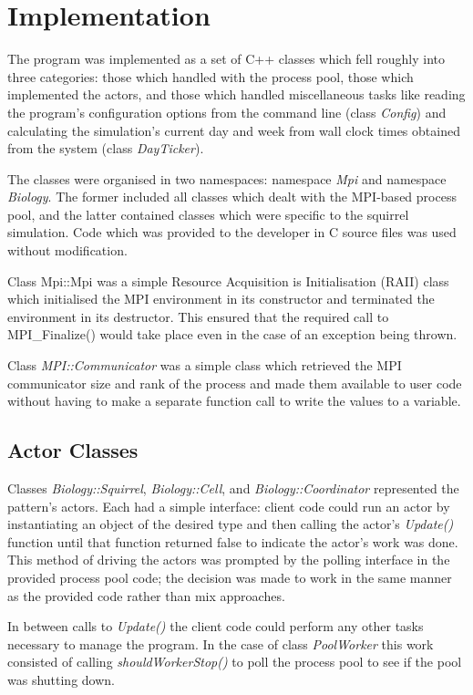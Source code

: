 \documentclass[11pt, oneside]{article}   %
\begin{document}
\newpage

\section{Implementation}
The program was implemented as a set of C++ classes which fell roughly into three categories: those which handled with the process pool, those which implemented the actors, and those which handled miscellaneous tasks like reading the program's configuration options from the command line (class {\em Config}) and calculating the simulation's current day and week from wall clock times obtained from the system (class {\em DayTicker}).

The classes were organised in two namespaces: namespace {\em Mpi} and namespace {\em Biology}.
The former included all classes which dealt with the MPI-based process pool, and the latter contained classes which were specific to the squirrel simulation.
Code which was provided to the developer in C source files was used without modification.

Class Mpi::Mpi was a simple Resource Acquisition is Initialisation (RAII) \cite{ref:Stroustrup} class which initialised the MPI environment in its constructor and terminated the environment in its destructor.
This ensured that the required call to MPI\_Finalize() would take place even in the case of an exception being thrown.  

Class {\em MPI::Communicator} was a simple class which retrieved the MPI communicator size and rank of the process and made them available to user code without having to make a separate function call to write the values to a variable.  

\subsection{Actor Classes}
Classes {\em Biology::Squirrel}, {\em Biology::Cell}, and {\em Biology::Coordinator} represented the pattern's actors.
Each had a simple interface: client code could run an actor by instantiating an object of the desired type and then calling the actor's {\em Update()} function until that function returned false to indicate the actor's work was done.  
This method of driving the actors was prompted by the polling interface in the provided process pool code; the decision was made to work in the same manner as the provided code rather than mix approaches.

In between calls to {\em Update()} the client code could perform any other tasks necessary to manage the program.
In the case of class {\em PoolWorker} this work consisted of calling {\em shouldWorkerStop()} to poll the process pool to see if the pool was shutting down.
\end{document}
